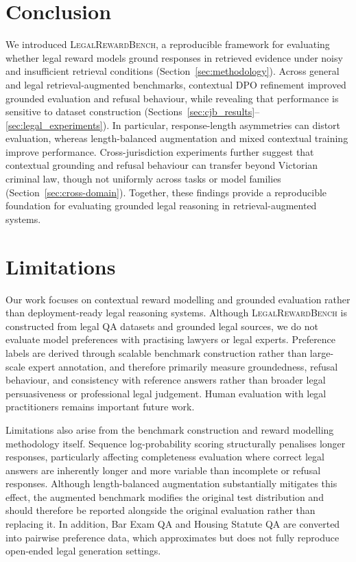 \documentclass{article}
\theoremstyle{plain}
\theoremstyle{definition}
\theoremstyle{remark}
\begin{document}
\section{Conclusion}

We introduced \textsc{LegalRewardBench}, a reproducible framework for evaluating whether legal reward models ground responses in retrieved evidence under noisy and insufficient retrieval conditions (Section~\ref{sec:methodology}). Across general and legal retrieval-augmented benchmarks, contextual DPO refinement improved grounded evaluation and refusal behaviour, while revealing that performance is sensitive to dataset construction (Sections~\ref{sec:cjb_results}--\ref{sec:legal_experiments}). In particular, response-length asymmetries can distort evaluation, whereas length-balanced augmentation and mixed contextual training improve performance. Cross-jurisdiction experiments further suggest that contextual grounding and refusal behaviour can transfer beyond Victorian criminal law, though not uniformly across tasks or model families (Section~\ref{sec:cross-domain}). Together, these findings provide a reproducible foundation for evaluating grounded legal reasoning in retrieval-augmented systems.


\section*{Limitations}

Our work focuses on contextual reward modelling and grounded evaluation rather than deployment-ready legal reasoning systems. Although \textsc{LegalRewardBench} is constructed from legal QA datasets and grounded legal sources, we do not evaluate model preferences with practising lawyers or legal experts. Preference labels are derived through scalable benchmark construction rather than large-scale expert annotation, and therefore primarily measure groundedness, refusal behaviour, and consistency with reference answers rather than broader legal persuasiveness or professional legal judgement. Human evaluation with legal practitioners remains important future work.

Limitations also arise from the benchmark construction and reward modelling methodology itself. Sequence log-probability scoring structurally penalises longer responses, particularly affecting completeness evaluation where correct legal answers are inherently longer and more variable than incomplete or refusal responses. Although length-balanced augmentation substantially mitigates this effect, the augmented benchmark modifies the original test distribution and should therefore be reported alongside the original evaluation rather than replacing it. In addition, Bar Exam QA and Housing Statute QA are converted into pairwise preference data, which approximates but does not fully reproduce open-ended legal generation settings.
\end{document}
